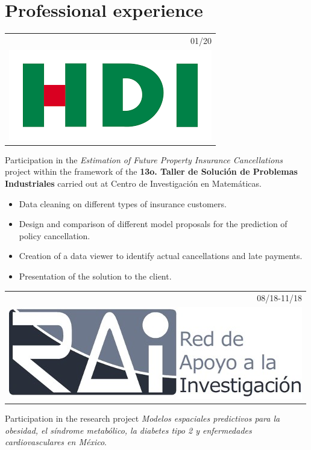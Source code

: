 \documentclass[]{friggeri-cv}
\begin{document}
\section{Professional experience}
\begin{entrylist}
\entry
   {   \begin{tabular}{r}
    		01/20\\
     		\hspace{0.87cm}\includegraphics[scale=0.15]{img/hdi.png}
	\end{tabular}
    }
    {\vspace{-0.91cm}}
    { }
    {Participation in the \textsl{Estimation of Future Property Insurance Cancellations} project within the framework of the \textbf{13o. Taller de Solución de Problemas Industriales} carried out at Centro de Investigación en Matemáticas.
    \begin{itemize}
	\item Data cleaning on different types of insurance customers.
	\item Design and comparison of different model proposals for the prediction of policy cancellation.
	\item Creation of a data viewer to identify actual cancellations and late payments.
	\item Presentation of the solution to the client.
    \end{itemize}}
\entry
   {   \begin{tabular}{r}
    		08/18-11/18\\
     		\includegraphics[scale=0.15]{img/RAI.jpg}
	\end{tabular}
    }
    {\vspace{-0.95cm}}
    { }
    {Participation in the research project \textsl{Modelos espaciales predictivos para la obesidad, el síndrome metabólico, la diabetes tipo 2 y enfermedades cardiovasculares en México}.
}
\end{entrylist}
\end{document}
